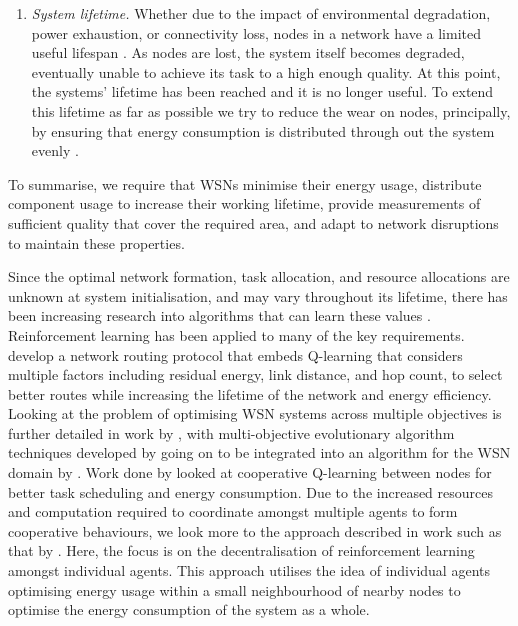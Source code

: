 \begin{enumerate}
\item \label{requirement:lifetime} \textit{System lifetime.} Whether due to the impact of environmental degradation, power exhaustion, or connectivity loss, nodes in a network have a limited useful lifespan \citep{Mak2009}. As nodes are lost, the system itself becomes degraded, eventually unable to achieve its task to a high enough quality. At this point, the systems' lifetime has been reached and it is no longer useful. To extend this lifetime as far as possible we try to reduce the wear on nodes, principally, by ensuring that energy consumption is distributed through out the system evenly \citep{BABAYO20171176, Engmann2018}.
\end{enumerate}
To summarise, we require that WSNs minimise their energy usage, distribute component usage to increase their working lifetime, provide measurements of sufficient quality that cover the required area, and adapt to network disruptions to maintain these properties.

Since the optimal network formation, task allocation, and resource allocations are unknown at system initialisation, and may vary throughout its lifetime, there has been increasing research into algorithms that can learn these values \citep{Al-Rawi2015}.  Reinforcement learning has been applied to many of the key requirements. \cite{Guo2019} develop a network routing protocol that embeds Q-learning that considers multiple factors including residual energy, link distance, and hop count, to select better routes while increasing the lifetime of the network and energy efficiency. 
Looking at the problem of optimising WSN systems across multiple objectives is further detailed in work by \cite{ s150717572}, with multi-objective evolutionary algorithm techniques developed by \cite{4633340} going on to be integrated into an algorithm for the WSN domain by \cite{SENGUPTA2013405}. Work done by \cite{doi:10.1155/2014/765182} looked at cooperative Q-learning between nodes for better task scheduling and energy consumption. Due to the increased resources and computation required to coordinate amongst multiple agents to form cooperative behaviours, we look more to the approach described in work such as that by \cite{10.1007/978-3-642-11814-2_4}. Here, the focus is on the decentralisation of reinforcement learning amongst individual agents. This approach utilises the idea of individual agents optimising energy usage within a small neighbourhood of nearby nodes to optimise the energy consumption of the system as a whole. 

